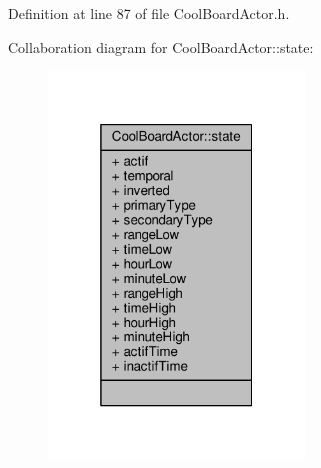 Definition at line 87 of file Cool\+Board\+Actor.\+h.



Collaboration diagram for Cool\+Board\+Actor\+:\+:state\+:
\nopagebreak
\begin{figure}[H]
\begin{center}
\leavevmode
\includegraphics[width=193pt]{d5/d44/struct_cool_board_actor_1_1state__coll__graph}
\end{center}
\end{figure}
